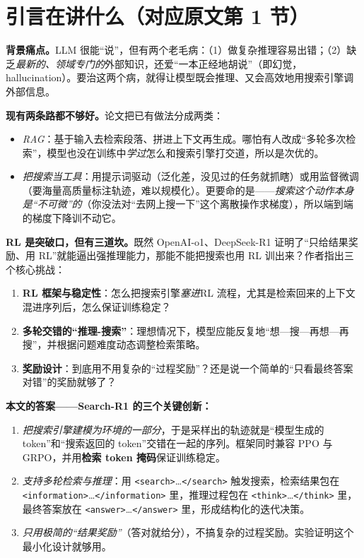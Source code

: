 \documentclass[11pt,UTF8,fontset=fandol]{ctexart}
\newcommand{\tg}[1]{\texttt{<#1>}}
\begin{document}
\section{引言在讲什么（对应原文第 1 节）}

\textbf{背景痛点。}\quad LLM 很能“说”，但有两个老毛病：（1）做复杂推理容易出错；（2）缺乏\emph{最新的、领域专门的}外部知识，还爱“一本正经地胡说”（即幻觉，hallucination）。要治这两个病，就得让模型既会推理、又会高效地用搜索引擎调外部信息。

\textbf{现有两条路都不够好。}\quad 论文把已有做法分成两类：
\begin{itemize}[leftmargin=1.4em]
\item \emph{RAG}：基于输入去检索段落、拼进上下文再生成。哪怕有人改成“多轮多次检索”，模型也没在训练中\emph{学过}怎么和搜索引擎打交道，所以是次优的。
\item \emph{把搜索当工具}：用提示词驱动（泛化差，没见过的任务就抓瞎）或用监督微调（要海量高质量标注轨迹，难以规模化）。更要命的是——\emph{搜索这个动作本身是“不可微”的}（你没法对“去网上搜一下”这个离散操作求梯度），所以端到端的梯度下降训不动它。
\end{itemize}

\textbf{RL 是突破口，但有三道坎。}\quad 既然 OpenAI-o1、DeepSeek-R1 证明了“只给结果奖励、用 RL”就能逼出强推理能力，那能不能把搜索也用 RL 训出来？作者指出三个核心挑战：
\begin{enumerate}[leftmargin=1.6em]
\item \textbf{RL 框架与稳定性}：怎么把搜索引擎\emph{塞进}RL 流程，尤其是检索回来的上下文混进序列后，怎么保证训练稳定？
\item \textbf{多轮交错的“推理-搜索”}：理想情况下，模型应能反复地“想—搜—再想—再搜”，并根据问题难度动态调整检索策略。
\item \textbf{奖励设计}：到底用不用复杂的“过程奖励”？还是说一个简单的“只看最终答案对错”的奖励就够了？
\end{enumerate}

\textbf{本文的答案——Search-R1 的三个关键创新：}
\begin{enumerate}[leftmargin=1.6em]
\item \emph{把搜索引擎建模为环境的一部分}，于是采样出的轨迹就是“模型生成的 token”和“搜索返回的 token”交错在一起的序列。框架同时兼容 PPO 与 GRPO，并用\textbf{检索 token 掩码}保证训练稳定。
\item \emph{支持多轮检索与推理}：用 \tg{search}…\tg{/search} 触发搜索，检索结果包在 \tg{information}…\tg{/information} 里，推理过程包在 \tg{think}…\tg{/think} 里，最终答案放在 \tg{answer}…\tg{/answer} 里，形成结构化的迭代决策。
\item \emph{只用极简的“结果奖励”}（答对就给分），不搞复杂的过程奖励。实验证明这个最小化设计就够用。
\end{enumerate}
\end{document}
